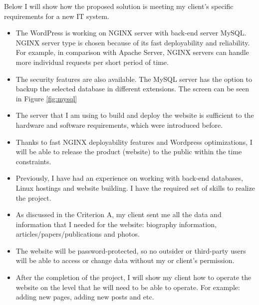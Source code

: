 \documentclass[a4paper, 12pt]{article}
\begin{document}
Below I will show how the proposed solution is meeting my client's specific requirements for a new IT system.

\begin{itemize}
  
\item The WordPress is working on NGINX server with back-end server MySQL. NGINX server type is chosen because of its fast deployability and reliability. For example, in comparison with Apache Server, NGINX servers can handle more individual requests per short period of time.

\item The security features are also available. The MySQL server has the option to backup the selected database in different extensions. The screen can be seen in Figure \ref{fig:mysql}

\item The server that I am using to build and deploy the website is sufficient to the hardware and software requirements, which were introduced before.

\item Thanks to fast NGINX deployability features and Wordpress optimizations, I will be able to release the product (website) to the public within the time constraints.

\item Previously, I have had an experience on working with back-end databases, Linux hostings and website building. I have the required set of skills to realize the project.

\item As discussed in the Criterion A, my client sent me all the data and information that I needed for the website: biography information, articles/papers/publications and photos.

\item The website will be password-protected, so no outsider or third-party users will be able to access or change data without my or client's permission.

\item After the completion of the project, I will show my client how to operate the website on the level that he will need to be able to operate. For example: adding new pages, adding new posts and etc.

\end{itemize}
\end{document}
